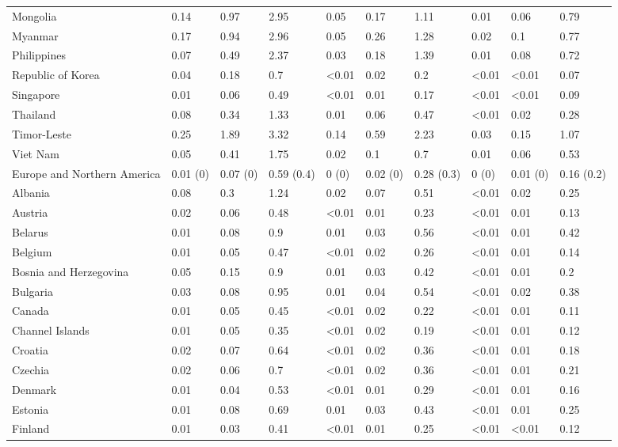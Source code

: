 \begin{longtable}[t]{llllllllll}
\addlinespace
Mongolia & 0.14 & 0.97 & 2.95 & 0.05 & 0.17 & 1.11 & 0.01 & 0.06 & 0.79\\
Myanmar & 0.17 & 0.94 & 2.96 & 0.05 & 0.26 & 1.28 & 0.02 & 0.1 & 0.77\\
Philippines & 0.07 & 0.49 & 2.37 & 0.03 & 0.18 & 1.39 & 0.01 & 0.08 & 0.72\\
Republic of Korea & 0.04 & 0.18 & 0.7 & <0.01 & 0.02 & 0.2 & <0.01 & <0.01 & 0.07\\
Singapore & 0.01 & 0.06 & 0.49 & <0.01 & 0.01 & 0.17 & <0.01 & <0.01 & 0.09\\
\addlinespace
Thailand & 0.08 & 0.34 & 1.33 & 0.01 & 0.06 & 0.47 & <0.01 & 0.02 & 0.28\\
Timor-Leste & 0.25 & 1.89 & 3.32 & 0.14 & 0.59 & 2.23 & 0.03 & 0.15 & 1.07\\
Viet Nam & 0.05 & 0.41 & 1.75 & 0.02 & 0.1 & 0.7 & 0.01 & 0.06 & 0.53\\
Europe and Northern America & 0.01 (0) & 0.07 (0) & 0.59 (0.4) & 0 (0) & 0.02 (0) & 0.28 (0.3) & 0 (0) & 0.01 (0) & 0.16 (0.2)\\
Albania & 0.08 & 0.3 & 1.24 & 0.02 & 0.07 & 0.51 & <0.01 & 0.02 & 0.25\\
\addlinespace
Austria & 0.02 & 0.06 & 0.48 & <0.01 & 0.01 & 0.23 & <0.01 & 0.01 & 0.13\\
Belarus & 0.01 & 0.08 & 0.9 & 0.01 & 0.03 & 0.56 & <0.01 & 0.01 & 0.42\\
Belgium & 0.01 & 0.05 & 0.47 & <0.01 & 0.02 & 0.26 & <0.01 & 0.01 & 0.14\\
Bosnia and Herzegovina & 0.05 & 0.15 & 0.9 & 0.01 & 0.03 & 0.42 & <0.01 & 0.01 & 0.2\\
Bulgaria & 0.03 & 0.08 & 0.95 & 0.01 & 0.04 & 0.54 & <0.01 & 0.02 & 0.38\\
\addlinespace
Canada & 0.01 & 0.05 & 0.45 & <0.01 & 0.02 & 0.22 & <0.01 & 0.01 & 0.11\\
Channel Islands & 0.01 & 0.05 & 0.35 & <0.01 & 0.02 & 0.19 & <0.01 & 0.01 & 0.12\\
Croatia & 0.02 & 0.07 & 0.64 & <0.01 & 0.02 & 0.36 & <0.01 & 0.01 & 0.18\\
Czechia & 0.02 & 0.06 & 0.7 & <0.01 & 0.02 & 0.36 & <0.01 & 0.01 & 0.21\\
Denmark & 0.01 & 0.04 & 0.53 & <0.01 & 0.01 & 0.29 & <0.01 & 0.01 & 0.16\\
\addlinespace
Estonia & 0.01 & 0.08 & 0.69 & 0.01 & 0.03 & 0.43 & <0.01 & 0.01 & 0.25\\
Finland & 0.01 & 0.03 & 0.41 & <0.01 & 0.01 & 0.25 & <0.01 & <0.01 & 0.12\\

\end{longtable}
